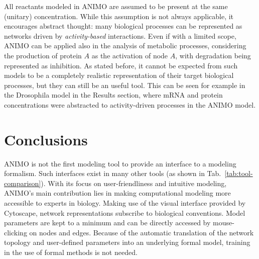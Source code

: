 \documentclass{bmcart}
\begin{document}
All reactants modeled in ANIMO are assumed to be present at the same
(unitary) concentration. While this assumption is not always applicable, it encourages
abstract thought: many biological processes can be represented as networks driven by
\emph{activity-based} interactions. Even if with a limited scope, ANIMO can be applied
also in the analysis of metabolic processes, considering the production of protein $A$ as
the activation of node $A$, with degradation being represented as inhibition. As stated before,
it cannot be expected from such models to be a completely realistic representation of their target biological
processes, but they can still be an useful tool. This can be seen for example in the Drosophila
model in the Results section, where mRNA and protein concentrations were abstracted to
activity-driven processes in the ANIMO model.





\section*{Conclusions}
% 
% 

ANIMO is not the first modeling tool to provide an interface to a
modeling formalism. Such interfaces exist in many other tools (as shown in Tab.~\ref{tab:tool-comparison}). With its
focus on user-friendliness and intuitive modeling, ANIMO's main contribution lies 
in making computational modeling more accessible to experts in biology.
Making use of the visual
interface provided by Cytoscape, network representations subscribe to biological conventions. 
Model parameters are kept to a minimum and can be directly accessed by mouse-clicking on 
nodes and edges. Because of the automatic translation of the network topology and 
user-defined parameters into an underlying formal model, training in the use of formal methods 
is not needed.
\end{document}
